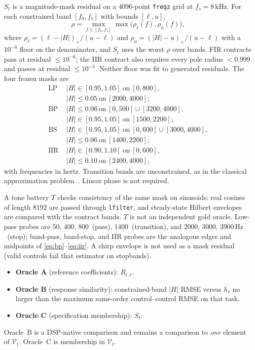 \documentclass{article}
\begin{document}
$S_t$ is a magnitude-mask residual on a $4096$-point \texttt{freqz}
grid at $f_s=8\,\mathrm{kHz}$.
For each constrained band $[f_0,f_1]$ with bounds $[\ell,u]$,
\begin{equation}
\rho=\max_{f\in[f_0,f_1]}
\max\bigl(\rho_\ell(f),\rho_u(f)\bigr),
\label{eq:rho}
\end{equation}
where $\rho_\ell=(\ell-\lvert H\rvert)_+/(u-\ell)$ and
$\rho_u=(\lvert H\rvert-u)_+/(u-\ell)$ with a $10^{-6}$ floor on
the denominator,
and $S_t$ uses the worst $\rho$ over bands.
FIR contracts pass at residual $\le 10^{-6}$; the IIR contract also
requires every pole radius $<0.999$ and passes at residual
$\le 10^{-3}$.
Neither floor was fit to generated residuals.
The four frozen masks are
\begin{align}
\text{LP }&
\lvert H\rvert\in[0.95,1.05]\ \mathrm{on}\ [0,800],
\nonumber\\
&\lvert H\rvert\le 0.05\ \mathrm{on}\ [2000,4000];
\label{eq:lp}\\
\text{BP }&
\lvert H\rvert\le 0.06\ \mathrm{on}\ [0,500]\cup[3200,4000],
\nonumber\\
&\lvert H\rvert\in[0.95,1.05]\ \mathrm{on}\ [1500,2200];
\label{eq:bp}\\
\text{BS }&
\lvert H\rvert\in[0.95,1.05]\ \mathrm{on}\ [0,600]\cup[3000,4000],
\nonumber\\
&\lvert H\rvert\le 0.06\ \mathrm{on}\ [1400,2200];
\label{eq:bs}\\
\text{IIR }&
\lvert H\rvert\in[0.90,1.10]\ \mathrm{on}\ [0,600],
\nonumber\\
&\lvert H\rvert\le 0.10\ \mathrm{on}\ [2400,4000],
\label{eq:iir}
\end{align}
with frequencies in hertz.
Transition bands are unconstrained, as in the classical approximation
problem~\cite{oppenheim2010dsp,rabiner1975fir}.
Linear phase is not required.

A tone battery $T$ checks consistency of the same mask on sinusoids:
real cosines of length $8192$ are passed through \texttt{lfilter}, and
steady-state Hilbert envelopes are compared with the contract bands.
$T$ is not an independent gold oracle.
Low-pass probes are $50$, $400$, $800$~(pass), $1400$~(transition),
and $2000$, $3000$, $3900\,\mathrm{Hz}$~(stop); band-pass, band-stop,
and IIR probes are the analogous edges and midpoints of
\eqref{eq:bp}--\eqref{eq:iir}.
A chirp envelope is not used as a mask residual (valid controls fail
that estimator on stopbands).
\begin{itemize}
\item \textbf{Oracle A} (reference coefficients): $R_{t,r}$.
\item \textbf{Oracle B} (response similarity): constrained-band
$\lvert H\rvert$ RMSE versus $h_r$ no larger than the maximum
same-order control--control RMSE on that task.
\item \textbf{Oracle C} (specification membership): $S_t$.
\end{itemize}
Oracle~B is a DSP-native comparison and remains a comparison to
\emph{one} element of $\mathcal{V}_t$.
Oracle~C is membership in $\mathcal{V}_t$.
\end{document}
